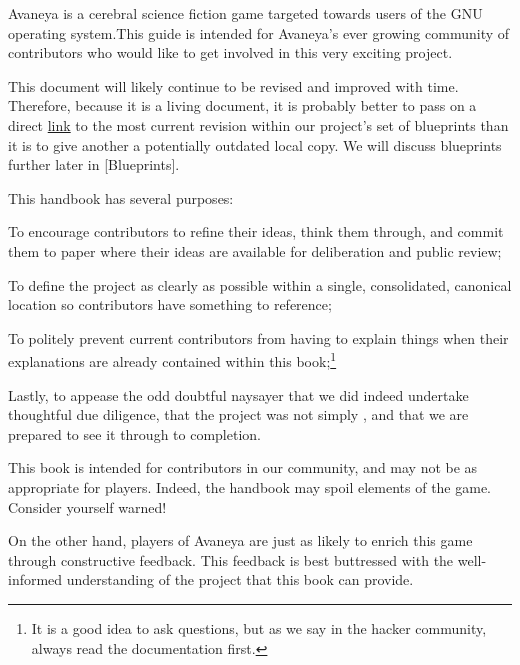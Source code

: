 

Avaneya is a cerebral science fiction game targeted towards users of the GNU operating system. This guide is intended for Avaneya's ever growing community of contributors who would like to get involved in this very exciting project.

This document will likely continue to be revised and improved with time. Therefore, because it is a living document, it is probably better to pass on a direct \href{\LatestHandbookURL}{link} to the most current revision within our project's set of blueprints than it is to give another a potentially outdated local copy. We will discuss blueprints further later in [Blueprints].

This handbook has several purposes:

\startitemize[4]
\item
To encourage contributors to refine their ideas, think them through, and commit them to paper where their ideas are available for deliberation and public review;

\item
To define the project as clearly as possible within a single, consolidated, canonical location so contributors have something to reference;

\item
To politely prevent current contributors from having to explain things when their explanations are already contained within this book;\footnote[rtfm]{It is a good idea to ask questions, but as we say in the hacker community, always read the documentation first.}

\item
Lastly, to appease the odd doubtful naysayer that we did indeed undertake thoughtful due diligence, that the project was not simply , and that we are prepared to see it through to completion.
\stopitemize

This book is intended for contributors in our community, and may not be as appropriate for players. Indeed, the handbook may spoil elements of the game. Consider yourself warned!

On the other hand, players of Avaneya are just as likely to enrich this game through constructive feedback. This feedback is best buttressed with the well-informed understanding of the project that this book can provide.

\StopChapter
